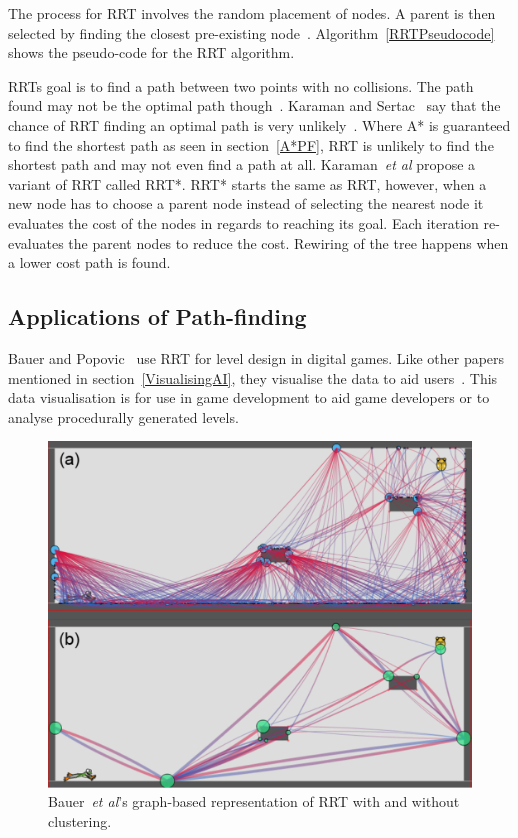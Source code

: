 \documentclass[journal]{IEEEtran}
\begin{document}
	The process for RRT involves the random placement of nodes. A parent is then selected by finding the closest pre-existing node~\cite{Kuffner2000}. Algorithm~\ref{RRTPseudocode} shows the pseudo-code for the RRT algorithm. 
	
	RRTs goal is to find a path between two points with no collisions.  The path found may not be the optimal path though~\cite{Kuffner2000, Karaman2011}. Karaman and Sertac~\cite{karaman2010} say that the chance of RRT finding an optimal path is very unlikely~\cite{karaman2010, Tremblay2014}. Where A* is guaranteed to find the shortest path as seen in section~\ref{A*PF}, RRT is unlikely to find the shortest path and may not even find a path at all.  
	Karaman~\textit{et al} propose a variant of RRT called RRT*. RRT* starts the same as RRT, however, when a new node has to choose a parent node instead of selecting the nearest node it evaluates the cost of the nodes in regards to reaching its goal. Each iteration re-evaluates the parent nodes to reduce the cost. Rewiring of the tree happens when a lower cost path is found.
	
	\subsection{Applications of Path-finding} \label{AppPathfinding}
	Bauer and Popovic~\cite{bauer2012} use RRT for level design in digital games. Like other papers mentioned in section~\ref{VisualisingAI}, they visualise the data to aid users~\cite{bauer2012, Haworth2010}. This data visualisation is for use in game development to aid game developers or to analyse procedurally generated levels. 
	
	\begin{figure}[h]
		\includegraphics[width=1.0\linewidth]{BauerRRT.png}
		\caption{ Bauer~\textit{et al}'s\cite{bauer2012} graph-based representation of RRT with and without clustering.}
		\label{BauerRRT}
	\end{figure} 
	
\end{document}
